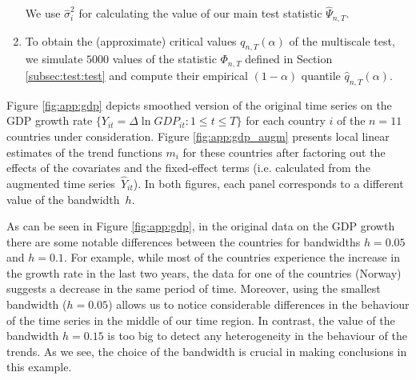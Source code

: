 \documentclass[a4paper,12pt]{article}
\begin{document}
\begin{enumerate}
We use $\hat{\sigma}^2_i$ for calculating the value of our main test statistic $\widehat{\Psi}_{n, T}$. %
\item To obtain the (approximate) critical values $q_{n, T}(\alpha)$ of the multiscale test, we simulate $5000$ values of the statistic $\Phi_{n, T}$ defined in Section \ref{subsec:test:test} and compute their empirical $(1-\alpha)$ quantile $\hat{q}_{n, T}(\alpha)$.
\end{enumerate}



Figure \ref{fig:app:gdp} depicts smoothed version of the original time series on the GDP growth rate $\{Y_{it} = \Delta \ln GDP_{it}: 1 \le t \le T\}$ for each country $i$ of the $n=11$ countries under consideration. Figure \ref{fig:app:gdp_augm} presents local linear estimates of the trend functions $m_i$ for these countries after factoring out the effects of the covariates and the fixed-effect terms (i.e. calculated from the augmented time series~$\widehat{Y}_{it}$). In both figures, each panel corresponds to a different value of the bandwidth~$h$.

As can be seen in Figure \ref{fig:app:gdp}, in the original data on the GDP growth there are some notable differences between the countries for bandwidths $h = 0.05$ and $h = 0.1$. For example, while most of the countries experience the increase in the growth rate in the last two years, the data for one of the countries (Norway) suggests a decrease in the same period of time. Moreover, using the smallest bandwidth ($h= 0.05$) allows us to notice considerable differences in the behaviour of the time series in the middle of our time region. In contrast, the value of the bandwidth $h = 0.15$ is too big to detect any heterogeneity in the behaviour of the trends. As we see, the choice of the bandwidth is crucial in making conclusions in this example.
\end{document}
